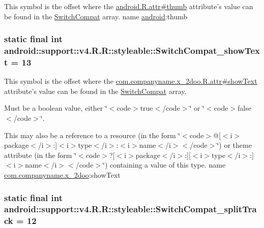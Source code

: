 This symbol is the offset where the \hyperlink{}{android.R.attr\#thumb} attribute's value can be found in the \hyperlink{classandroid_1_1support_1_1v4_1_1_r_1_1styleable_276d9c1ec80821a3e0fcdaa41daa75a0}{SwitchCompat} array.  name \hyperlink{namespaceandroid}{android}:thumb \hypertarget{classandroid_1_1support_1_1v4_1_1_r_1_1styleable_0cc5a1a2d3ed39ddffe812e716bf2ef4}{
\subsubsection[{SwitchCompat\_\-showText}]{\setlength{\rightskip}{0pt plus 5cm}static final int android::support::v4.R.R::styleable::SwitchCompat\_\-showText = 13}}
\label{classandroid_1_1support_1_1v4_1_1_r_1_1styleable_0cc5a1a2d3ed39ddffe812e716bf2ef4}


This symbol is the offset where the \hyperlink{classcom_1_1companyname_1_1x__2doo_1_1_r_1_1attr_9517eb4c9166fcf0007455b880b36d52}{com.companyname.x\_\-2doo.R.attr\#showText} attribute's value can be found in the \hyperlink{classandroid_1_1support_1_1v4_1_1_r_1_1styleable_276d9c1ec80821a3e0fcdaa41daa75a0}{SwitchCompat} array.

Must be a boolean value, either \char`\"{}$<$code$>$true$<$/code$>$\char`\"{} or \char`\"{}$<$code$>$false$<$/code$>$\char`\"{}. 

This may also be a reference to a resource (in the form \char`\"{}$<$code$>$@\mbox{[}$<$i$>$package$<$/i$>$:\mbox{]}$<$i$>$type$<$/i$>$:$<$i$>$name$<$/i$>$$<$/code$>$\char`\"{}) or theme attribute (in the form \char`\"{}$<$code$>$?\mbox{[}$<$i$>$package$<$/i$>$:\mbox{]}\mbox{[}$<$i$>$type$<$/i$>$:\mbox{]}$<$i$>$name$<$/i$>$$<$/code$>$\char`\"{}) containing a value of this type.  name \hyperlink{namespacecom_1_1companyname_1_1x__2doo}{com.companyname.x\_\-2doo}:showText \hypertarget{classandroid_1_1support_1_1v4_1_1_r_1_1styleable_a0d331497170a5613b2fe77a4e795649}{
\subsubsection[{SwitchCompat\_\-splitTrack}]{\setlength{\rightskip}{0pt plus 5cm}static final int android::support::v4.R.R::styleable::SwitchCompat\_\-splitTrack = 12}}
\label{classandroid_1_1support_1_1v4_1_1_r_1_1styleable_a0d331497170a5613b2fe77a4e795649}


